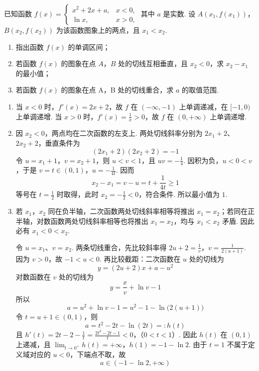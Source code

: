 \begin{problem}
已知函数 \( f(x) = \begin{cases}
x^2 + 2x + a, & x < 0,\\
\ln x, & x > 0,
\end{cases} \) 其中 \(a\) 是实数. 设 \( A(x_1, f(x_1))\)，\( B(x_2, f(x_2))\) 为该函数图象上的两点，且 \( x_1 < x_2 \).
\begin{enumerate}
\item 指出函数 \( f(x) \) 的单调区间；
\item 若函数 \( f(x) \) 的图象在点 \(A\)，\(B\) 处的切线互相垂直，且 \( x_{2} < 0 \)，求 \( x_{2} - x_{1} \) 的最小值；
\item 若函数 \( f(x) \) 的图象在点 A，B 处的切线重合，求 \(a\) 的取值范围.
\end{enumerate}
\end{problem}

\begin{solution}
\begin{enumerate}
\item 当 \(x<0\) 时，\(f'(x)=2x+2\)，故 \(f\) 在 \((-\infty,-1)\) 上单调递减，在 \([-1,0)\) 上单调递增. 当 \(x>0\) 时，\(f'(x)=\frac1x>0\)，故 \(f\) 在 \((0,+\infty)\) 上单调递增.

\item 因 \(x_2<0\)，两点均在二次函数的左支上. 两处切线斜率分别为 \(2x_1+2\)、\(2x_2+2\)，垂直条件为
\[
(2x_1+2)(2x_2+2)=-1
\]
令 \(u=x_1+1\)，\(v=x_2+1\)，则 \(u<v<1\)，且 \(uv=-\frac14\). 因积为负，\(u<0<v\)，于是 \(v=t\in(0,1)\)，\(u=-\frac1{4t}\). 因而
\[
x_2-x_1=v-u=t+\frac1{4t}\geqslant1
\]
等号在 \(t=\frac12\) 时取得，此时 \(x_2=-\frac12<0\)，符合条件. 所以最小值为 \(1\).

\item 若 \(x_1\)，\(x_2\) 同在负半轴，二次函数两处切线斜率相等将推出 \(x_1=x_2\)；若同在正半轴，对数函数两处切线斜率相等也将推出 \(x_1=x_2\)，均与 \(x_1<x_2\) 矛盾. 因此必有 \(x_1<0<x_2\).

令 \(u=x_1\)、\(v=x_2\). 两条切线重合，先比较斜率得
\(2u+2=\frac1v\)，\(v=\frac1{2(u+1)}\).
因为 \(v>0\)，故 \(-1<u<0\). 再比较截距：二次函数在 \(u\) 处的切线为
\[
y=(2u+2)x+a-u^2
\]
对数函数在 \(v\) 处的切线为
\[
y=\frac{x}{v}+\ln v-1
\]
所以
\[
a=u^2+\ln v-1=u^2-1-\ln\bigl(2(u+1)\bigr)
\]
令 \(t=u+1\in(0,1)\)，则
\[
a=t^2-2t-\ln(2t)=:h(t)
\]
且
\(h'(t)=2t-2-\frac1t=\frac{2t^2-2t-1}{t}<0\)，（\(0<t<1\)）.
因此 \(h(t)\) 在 \((0,1)\) 上递减，且
\(\lim_{t\to0^+}h(t)=+\infty\)，\(h(1)=-1-\ln2\).
由于 \(t=1\) 不属于定义域对应的 \(u<0\)，下端点不取，故
\[
a\in(-1-\ln2,+\infty)
\]
\end{enumerate}
\end{solution}
